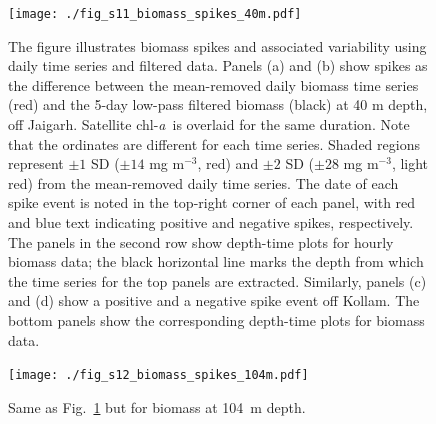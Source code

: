\documentclass[12pt,a4paper]{article}
\newcommand{\chla}{chl-{\emph{a}}}
\begin{document}
\begin{figure}[htbp]
	\centering
	\texttt{[image: ./fig\_s11\_biomass\_spikes\_40m.pdf]} 
	\caption{The figure illustrates biomass spikes and associated variability using daily time series and filtered data. Panels (a) and (b) show spikes as the difference between the mean-removed daily biomass time series (red) and the 5-day low-pass filtered biomass (black) at 40 m depth, off Jaigarh. Satellite \chla\ is overlaid for the same duration. Note that the ordinates are different for each time series. Shaded regions represent $\pm 1$ SD ($\pm 14$ mg m$^{-3}$, red) and $\pm 2$ SD ($\pm 28$ mg m$^{-3}$, light red) from the mean-removed daily time series. The date of each spike event is noted in the top-right corner of each panel, with red and blue text indicating positive and negative spikes, respectively. The panels in the second row show depth-time plots for hourly biomass data; the black horizontal line marks the depth from which the time series for the top panels are extracted. Similarly, panels (c) and (d) show a positive and a negative spike event off Kollam. The bottom panels show the corresponding depth-time plots for biomass data.}
	\label{fig:biomass_spike_40m}
\end{figure}

\begin{figure}[htbp]
	\centering
	\texttt{[image: ./fig\_s12\_biomass\_spikes\_104m.pdf]} 
	\caption{Same as Fig.~\ref{fig:biomass_spike_40m} but for biomass at 104~m depth.}
	\label{fig:biomass_spike_104m}
\end{figure}
\end{document}
